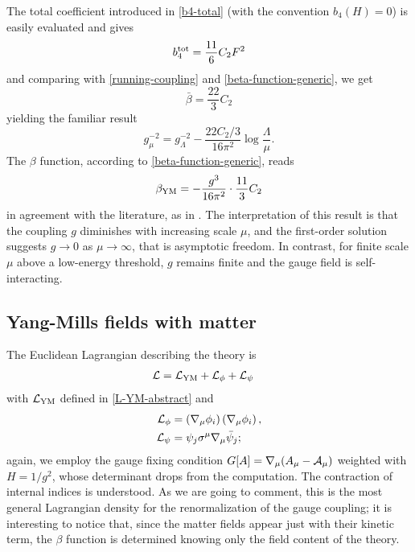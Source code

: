 The total coefficient introduced in \eqref{b4-total} (with the convention $b_4(H) = 0$) is easily evaluated and gives
\begin{equation}
b_4^{{ \text{tot} }} = \frac{11}{6} C_2 F^2
\end{equation}
and comparing with \eqref{running-coupling} and \eqref{beta-function-generic}, we get
\begin{equation}
\bar \beta = \frac{22}{3} C_2
\end{equation}
yielding the familiar result
\begin{equation}
g^{- 2 }_\mu = g^{- 2 }_\Lambda  - \frac{ {22 C_2}/{3}  }{ 16 \pi^2 } \log \frac{\Lambda}{\mu}.
\end{equation}
The $\beta$ function, according to \eqref{beta-function-generic}, reads
\begin{equation}
\beta_{ \text{YM} } = - \frac{g^3}{16 \pi^2} \cdot\frac{11}{3} C_2
\end{equation}
in agreement with the literature, as in \cite{Ram, WeinbergII}.
The interpretation of this result is that the coupling $g$ diminishes with increasing scale $\mu$, and the first-order solution suggests $g \rightarrow 0$ as $\mu \rightarrow \infty$, that is asymptotic freedom. In contrast, for finite scale $\mu$ above a low-energy threshold, $g$ remains finite and the gauge field is self-interacting.


\subsection{Yang-Mills fields with matter }


The Euclidean Lagrangian describing the theory is
\begin{align}
{ \mathcal{L} } & = 
{ \mathcal{L} }_{ \text{YM} } + { \mathcal{L} }_{\phi} + { \mathcal{L} }_{\psi}
\end{align}
with ${ \mathcal{L} }_{ \text{YM} }$ defined in \eqref{L-YM-abstract} and
\begin{align}
{ \mathcal{L} }_{\phi} &= \left( { \mathcal{\nabla} }_\mu \phi_i \right)  \left( { \mathcal{\nabla} }_\mu \phi_i \right),\\
{ \mathcal{L} }_{\psi} &=  \psi_j \sigma^\mu { \mathcal{\nabla} }_\mu \bar \psi_j ;
\end{align}
again, we employ the gauge fixing condition
\(
{G}[A] = { \mathcal{\nabla} }_\mu ( A_\mu - \mathcal{A}_\mu )
\)
weighted with $ H =  1/g^2 $, whose determinant drops from the computation. The contraction of internal indices is understood. As we are going to comment, this is the most general Lagrangian density for the renormalization of the gauge coupling; it is interesting to notice that, since the matter fields appear just with their kinetic term, the $ \beta $ function is determined knowing only the field content of the theory.

